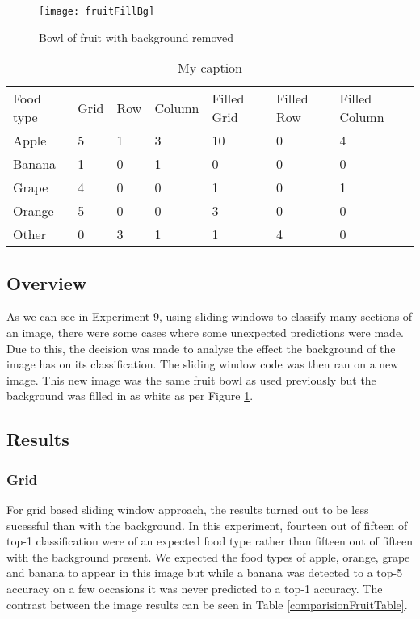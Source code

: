 \begin{figure}
    \texttt{[image: fruitFillBg]}
    \caption{Bowl of fruit with background removed}
    \label{fig:filledFruit}
\end{figure}

\begin{table}[]
    \centering
    \caption{My caption}
    \label{my-label}
    \begin{tabular}{lllllll}
        Food type & Grid & Row & Column & Filled Grid & Filled Row & Filled
        Column \\
        Apple     & 5    & 1   & 3      & 10          & 0          & 4
        \\
        Banana    & 1    & 0   & 1      & 0           & 0          & 0
        \\
        Grape     & 4    & 0   & 0      & 1           & 0          & 1
        \\
        Orange    & 5    & 0   & 0      & 3           & 0          & 0
        \\
        Other     & 0    & 3   & 1      & 1           & 4          & 0            
    \end{tabular}
\end{table}

\subsection*{Overview}
As we can see in Experiment 9, using sliding windows to classify many sections
of an image, there were some cases where some unexpected predictions were made.
Due to this, the decision was made to analyse the effect the background of the
image has on its classification. The sliding window code was then ran on a new
image. This new image was the same fruit bowl as used previously but the
background was filled in as white as per Figure \ref{fig:filledFruit}.

\subsection*{Results}
\subsubsection*{Grid}
For grid based sliding window approach, the results turned out to be less
sucessful than with the background. In this experiment, fourteen out of fifteen
of top-1 classification were of an expected food type rather than fifteen out of
fifteen with the background present. We expected the food types of apple,
orange, grape and banana to appear in this image but while a banana was detected
to a top-5 accuracy on a few occasions it was never predicted to a top-1
accuracy. The contrast between the image results can be seen in Table
\ref{comparisionFruitTable}.

